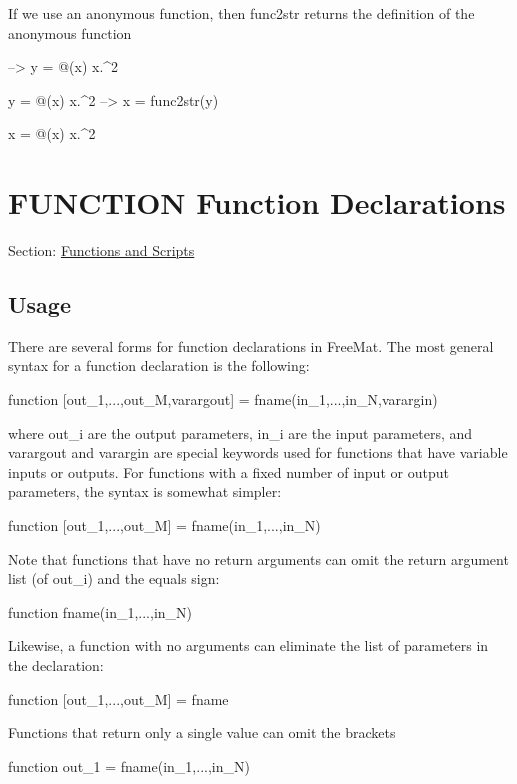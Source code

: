 If we use an anonymous function, then {\ttfamily func2str} returns the definition of the anonymous function


\begin{DoxyVerbInclude}
--> y = @(x) x.^2

y = 
 @(x)   x.^2
--> x = func2str(y)

x = 
 @(x)   x.^2
\end{DoxyVerbInclude}
 \hypertarget{functions_function}{}\section{F\-U\-N\-C\-T\-I\-O\-N Function Declarations}\label{functions_function}
Section\-: \hyperlink{sec_functions}{Functions and Scripts} \hypertarget{vtkwidgets_vtkxyplotwidget_Usage}{}\subsection{Usage}\label{vtkwidgets_vtkxyplotwidget_Usage}
There are several forms for function declarations in Free\-Mat. The most general syntax for a function declaration is the following\-: \begin{DoxyVerb}  function [out_1,...,out_M,varargout] = fname(in_1,...,in_N,varargin)
\end{DoxyVerb}
 where {\ttfamily out\-\_\-i} are the output parameters, {\ttfamily in\-\_\-i} are the input parameters, and {\ttfamily varargout} and {\ttfamily varargin} are special keywords used for functions that have variable inputs or outputs. For functions with a fixed number of input or output parameters, the syntax is somewhat simpler\-: \begin{DoxyVerb}  function [out_1,...,out_M] = fname(in_1,...,in_N)
\end{DoxyVerb}
 Note that functions that have no return arguments can omit the return argument list (of {\ttfamily out\-\_\-i}) and the equals sign\-: \begin{DoxyVerb}  function fname(in_1,...,in_N)
\end{DoxyVerb}
 Likewise, a function with no arguments can eliminate the list of parameters in the declaration\-: \begin{DoxyVerb}  function [out_1,...,out_M] = fname
\end{DoxyVerb}
 Functions that return only a single value can omit the brackets \begin{DoxyVerb}  function out_1 = fname(in_1,...,in_N)
\end{DoxyVerb}


